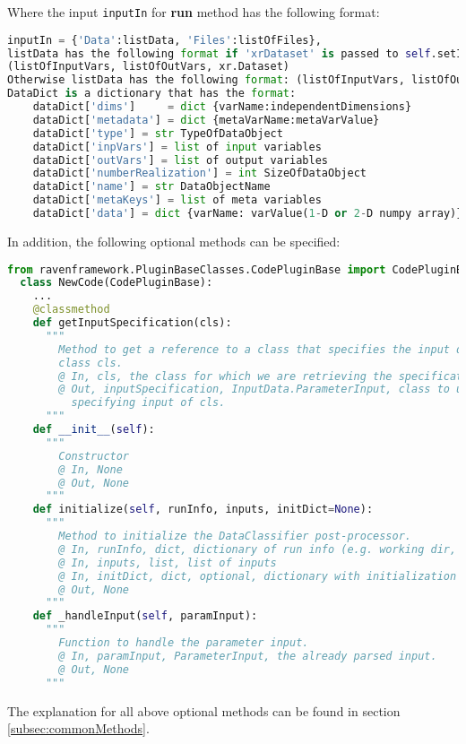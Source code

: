 Where the input \texttt{inputIn} for \textbf{run} method has the following format:
\begin{lstlisting}[language=python, basicstyle=\scriptsize\ttfamily, breaklines=True, columns=fullflexible]
inputIn = {'Data':listData, 'Files':listOfFiles},
listData has the following format if 'xrDataset' is passed to self.setInputDataType('xrDataset')
(listOfInputVars, listOfOutVars, xr.Dataset)
Otherwise listData has the following format: (listOfInputVars, listOfOutVars, DataDict) with
DataDict is a dictionary that has the format:
    dataDict['dims']     = dict {varName:independentDimensions}
    dataDict['metadata'] = dict {metaVarName:metaVarValue}
    dataDict['type'] = str TypeOfDataObject
    dataDict['inpVars'] = list of input variables
    dataDict['outVars'] = list of output variables
    dataDict['numberRealization'] = int SizeOfDataObject
    dataDict['name'] = str DataObjectName
    dataDict['metaKeys'] = list of meta variables
    dataDict['data'] = dict {varName: varValue(1-D or 2-D numpy array)}
\end{lstlisting}

In addition, the following optional methods can be specified:
\begin{lstlisting}[language=python, basicstyle=\scriptsize\ttfamily, breaklines=True, columns=fullflexible]
  from ravenframework.PluginBaseClasses.CodePluginBase import CodePluginBase
  class NewCode(CodePluginBase):
    ...
    @classmethod
    def getInputSpecification(cls):
      """
        Method to get a reference to a class that specifies the input data for
        class cls.
        @ In, cls, the class for which we are retrieving the specification
        @ Out, inputSpecification, InputData.ParameterInput, class to use for
          specifying input of cls.
      """
    def __init__(self):
      """
        Constructor
        @ In, None
        @ Out, None
      """
    def initialize(self, runInfo, inputs, initDict=None):
      """
        Method to initialize the DataClassifier post-processor.
        @ In, runInfo, dict, dictionary of run info (e.g. working dir, etc)
        @ In, inputs, list, list of inputs
        @ In, initDict, dict, optional, dictionary with initialization options
        @ Out, None
      """
    def _handleInput(self, paramInput):
      """
        Function to handle the parameter input.
        @ In, paramInput, ParameterInput, the already parsed input.
        @ Out, None
      """
\end{lstlisting}

The explanation for all above optional methods can be found in section \ref{subsec:commonMethods}.
